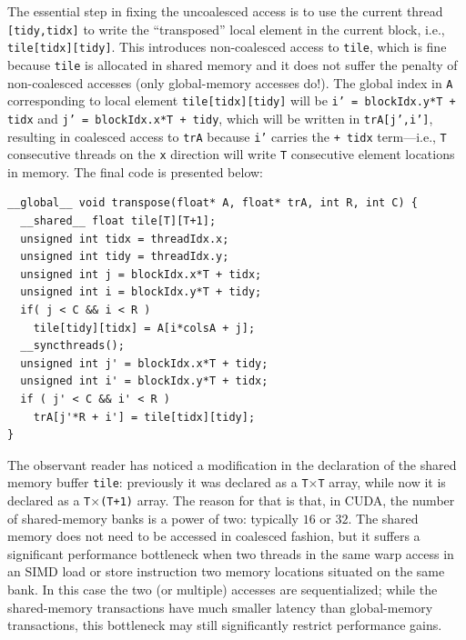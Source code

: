 \documentclass[acmsmall,review]{acmart}\settopmatter{printfolios=true,printccs=false,printacmref=false}
\begin{document}
The essential step in fixing the uncoalesced access is to use the current thread 
{\tt [tidy,tidx]} to write the ``transposed'' local element in the current block, 
i.e., {\tt tile[tidx][tidy]}. This introduces non-coalesced access to {\tt tile},
which is fine because {\tt tile} is allocated in shared memory and it does not
suffer the penalty of non-coalesced accesses (only global-memory accesses do!).
The global index in {\tt A} corresponding to local element  {\tt tile[tidx][tidy]}
will be {\tt i' = blockIdx.y*T + tidx} and {\tt j' = blockIdx.x*T + tidy},
which will be written in {\tt trA[j',i']}, resulting in coalesced access to
{\tt trA} because {\tt i'} carries the {\tt + tidx} term---i.e., {\tt T}
consecutive threads on the {\tt x} direction will write {\tt T} consecutive 
element locations in memory. The final code is presented below:
\begin{lstlisting}[mathescape=true]
__global__ void transpose(float* A, float* trA, int R, int C) {
  __shared__ float tile[T][T+1];
  unsigned int tidx = threadIdx.x;
  unsigned int tidy = threadIdx.y;
  unsigned int j = blockIdx.x*T + tidx;
  unsigned int i = blockIdx.y*T + tidy;
  if( j < C && i < R )
    tile[tidy][tidx] = A[i*colsA + j];
  __syncthreads();
  unsigned int j' = blockIdx.x*T + tidy;
  unsigned int i' = blockIdx.y*T + tidx;
  if ( j' < C && i' < R )
    trA[j'*R + i'] = tile[tidx][tidy];
}
\end{lstlisting}\vspace{-1ex}

The observant reader has noticed a modification in the declaration of the
shared memory buffer {\tt tile}: previously it was declared as a {\tt T$\times$T}
array, while now it is declared as a {\tt T$\times$(T+1)} array. 
The reason for that is that, in CUDA, the number of shared-memory banks is
a power of two: typically $16$ or $32$. The shared memory does not need to
be accessed in coalesced fashion, but it suffers a significant performance
bottleneck when two threads in the same warp access in an SIMD load or store
instruction two memory locations situated on the same bank. In this case the
two (or multiple) accesses are sequentialized; while the shared-memory transactions
have much smaller latency than global-memory transactions, this bottleneck may
still significantly restrict performance gains.
\end{document}
